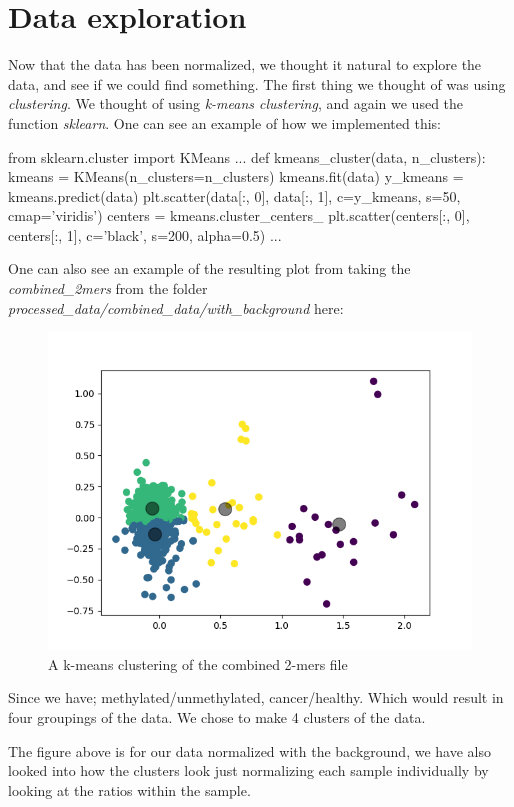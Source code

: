 \chapter{Data exploration}
Now that the data has been normalized, we thought it natural to explore the data, and see if we could find something. The first thing we thought of was using \textit{clustering}. We thought of using \textit{k-means clustering}, and again we used the function \textit{sklearn}. One can see an example of how we implemented this:

\begin{python}
from sklearn.cluster import KMeans
...
def kmeans_cluster(data, n_clusters):
    kmeans = KMeans(n_clusters=n_clusters)
    kmeans.fit(data)
    y_kmeans = kmeans.predict(data)
    plt.scatter(data[:, 0], data[:, 1], c=y_kmeans, s=50, cmap='viridis')
    centers = kmeans.cluster_centers_
    plt.scatter(centers[:, 0], centers[:, 1], c='black', s=200, alpha=0.5)
...
\end{python}

One can also see an example of the resulting plot from taking the \textit{combined\_2mers} from the folder \textit{processed\_data/combined\_data/with\_background} here:

\begin{figure}[H]
	\centering
	\includegraphics[width=0.7\linewidth]{../../figures/exploration/with_background/combined_2mers.png}
	\caption{A k-means clustering of the combined 2-mers file}
	\label{fig:kmeans0}
\end{figure}

Since we have; methylated/unmethylated, cancer/healthy. Which would result in four groupings of the data. We chose to make 4 clusters of the data.

The figure above is for our data normalized with the background, we have also looked into how the clusters look just normalizing each sample individually by looking at the ratios within the sample.

